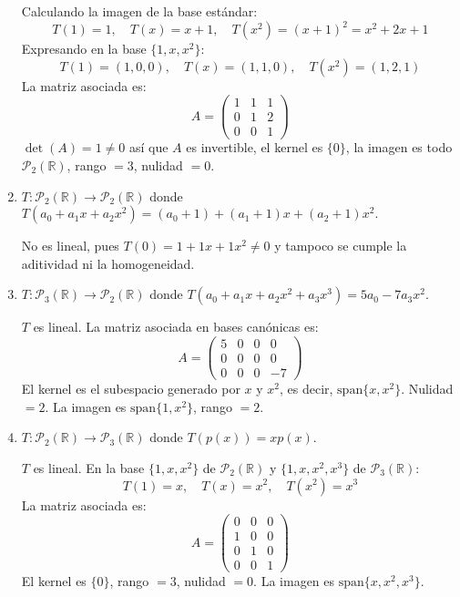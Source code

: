 \begin{prob}
\begin{enumerate}[$a)$]
\begin{myproof}
Calculando la imagen de la base estándar:
\[
T(1) = 1, \quad T(x) = x+1, \quad T(x^2) = (x+1)^2 = x^2 + 2x + 1
\]
Expresando en la base $\{1, x, x^2\}$:
\[
T(1) = (1, 0, 0), \quad T(x) = (1, 1, 0), \quad T(x^2) = (1, 2, 1)
\]
La matriz asociada es:
\[
A = \begin{pmatrix}
1 & 1 & 1 \\
0 & 1 & 2 \\
0 & 0 & 1
\end{pmatrix}
\]
$\det(A) = 1 \neq 0$ así que $A$ es invertible, el kernel es $\{0\}$, la imagen es todo $\mathcal{P}_2(\mathbb{R})$, rango $=3$, nulidad $=0$.
\end{myproof}

\item $T:\mathcal{P}_{2}(\mathbb{R}) \rightarrow \mathcal{P}_{2}(\mathbb{R})$ donde $T(a_0+a_1x+a_2x^2)=(a_0+1)+(a_1+1)x+(a_2+1)x^2.$
\begin{myproof}
No es lineal, pues $T(0) = 1 + 1x + 1x^2 \neq 0$ y tampoco se cumple la aditividad ni la homogeneidad.
\end{myproof}

\item $T:\mathcal{P}_{3}(\mathbb{R}) \rightarrow \mathcal{P}_{2}(\mathbb{R})$ donde $T(a_0+a_1x+a_2x^2+a_3x^3)= 5a_0-7a_3x^2.$
\begin{myproof}
$T$ es lineal. La matriz asociada en bases canónicas es:
\[
A = \begin{pmatrix}
5 & 0 & 0 & 0 \\
0 & 0 & 0 & 0 \\
0 & 0 & 0 & -7
\end{pmatrix}
\]
El kernel es el subespacio generado por $x$ y $x^2$, es decir, $\text{span}\{x, x^2\}$. Nulidad $=2$. La imagen es $\text{span}\{1, x^2\}$, rango $=2$.
\end{myproof}

\item $T:\mathcal{P}_{2}(\mathbb{R}) \rightarrow \mathcal{P}_{3}(\mathbb{R})$ donde $T(p(x))=xp(x).$
\begin{myproof}
$T$ es lineal. En la base $\{1, x, x^2\}$ de $\mathcal{P}_2(\mathbb{R})$ y $\{1, x, x^2, x^3\}$ de $\mathcal{P}_3(\mathbb{R})$:
\[
T(1) = x, \quad T(x) = x^2, \quad T(x^2) = x^3
\]
La matriz asociada es:
\[
A = \begin{pmatrix}
0 & 0 & 0 \\
1 & 0 & 0 \\
0 & 1 & 0 \\
0 & 0 & 1
\end{pmatrix}
\]
El kernel es $\{0\}$, rango $=3$, nulidad $=0$. La imagen es $\text{span}\{x, x^2, x^3\}$.
\end{myproof}


\end{enumerate}
\end{prob}
